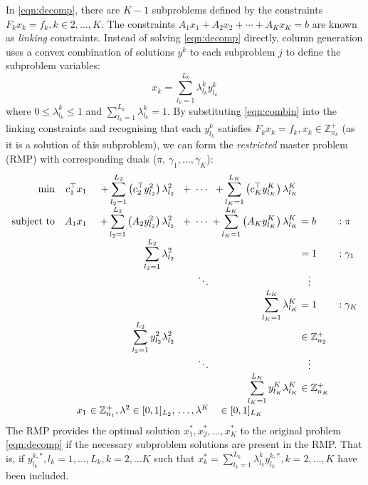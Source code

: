 In \eqref{eqn:decomp}, there are $K-1$ subproblems defined by the constraints $F_k x_k = f_k, k \in 2, \ldots, K$. The constraints $A_1 x_1 + A_2 x_2 + \cdots + A_K x_K = b$ are known as \textit{linking} constraints. Instead of solving \eqref{eqn:decomp} directly, column generation uses a convex combination of solutions $y^k$ to each subproblem $j$ to define the subproblem variables:
\begin{equation}
x_k = \sum_{l_k=1}^{L_k} \lambda^k_{l_k} y^k_{l_k} \label{eqn:combin}
\end{equation}
where $0 \leq \lambda^k_{l_k} \leq 1$ and $\sum_{l_k=1}^{L_k} \lambda^k_{l_k} = 1$. By substituting \eqref{eqn:combin} into the linking constraints and recognising that each $y^k_{l_k}$ satisfies $F_k x_k = f_k, x_k \in \mathbb{Z}^{+}_{n_k}$ (as it is a solution of this subproblem), we can form the \textit{restricted} master problem (RMP) with corresponding duals ($\pi$, $\gamma_1, \ldots, \gamma_K$):
\begin{equation}
\begin{array}{rr@{\ }r@{\ }r@{\ }r@{\ }ll}
             \min & c_1^\top x_1 & + \displaystyle\sum_{l_2=1}^{L_2} \left(c_2^\top y^2_{l_2} \right) \lambda^2_{l_2} & + \ \cdots & + \displaystyle\sum_{l_K=1}^{L_K} \left(c_K^\top y^K_{l_K} \right) \lambda^K_{l_K} \\
\text{subject to} & A_1 x_1      & + \displaystyle\sum_{l_2=1}^{L_2} \left(A_2 y^2_{l_2} \right) \lambda^2_{l_2} & + \ \cdots & + \displaystyle\sum_{l_K=1}^{L_K} \left( A_K y^K_{l_K} \right) \lambda^K_{l_K}      & = b & : \pi \\
                  &              &   \displaystyle\sum_{l_2=1}^{L_2} \lambda^2_{l_2}      &          &                & = 1 & : \gamma_1 \\
                  &              &                &  \ddots  &                & \ \ \vdots \\
                  &              &                &          &   \displaystyle\sum_{l_K=1}^{L_K} \lambda^K_{l_K}      & = 1 & : \gamma_K \\
                  &              &   \displaystyle\sum_{l_2=1}^{L_2} y^2_{l_2} \lambda^2_{l_2}      &          &                & \in \mathbb{Z}^{+}_{n_2} \\
                  &              &                &  \ddots  &                & \ \ \vdots \\
                  &              &                &          &   \displaystyle\sum_{l_K=1}^{L_K} y^K_{l_K} \lambda^K_{l_K}      & \in \mathbb{Z}^{+}_{n_K} \\
                  &          x_1 & \in \mathbb{Z}^{+}_{n_1}, \lambda^2 \in [0, 1]_{L_2}, & \ldots, \lambda^K & \in [0, 1]_{L_K} \hspace{1.25cm} &
\end{array}
\label{eqn:rmp}
\end{equation}
The RMP provides the optimal solution $x^*_1, x^*_2, \ldots, x^*_K$ to the original problem \eqref{eqn:decomp} if the necessary subproblem solutions are present in the RMP. That is, if $y^{k,*}_{l_k}, l_k =1, \ldots, L_k, k = 2, \ldots K$ such that $x^*_k = \sum_{l_k=1}^{L_k} \lambda^k_{l_k} y^{k,*}_{l_k}, k = 2, \ldots, K$ have been included.

